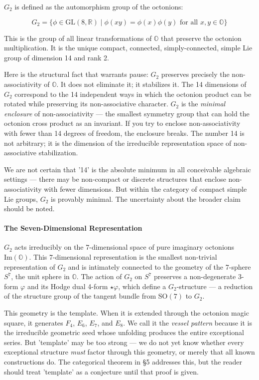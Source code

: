 \documentclass[12pt,a4paper]{article}
\newcommand{\pilcrow}{\S}
\begin{document}
$G_2$ is defined as the automorphism group of the octonions:

\[G_2 = \{ \phi \in \text{GL}(8,\mathbb{R}) \mid \phi(xy) = \phi(x)\phi(y) \text{ for all } x,y \in \mathbb{O} \}\]

This is the group of all linear transformations of $\mathbb{O}$ that preserve the octonion multiplication. It is the unique compact, connected, simply-connected, simple Lie group of dimension 14 and rank 2.

Here is the structural fact that warrants pause: $G_2$ preserves precisely the non-associativity of $\mathbb{O}$. It does not eliminate it; it stabilizes it. The 14 dimensions of $G_2$ correspond to the 14 independent ways in which the octonion product can be rotated while preserving its non-associative character. $G_2$ is the \emph{minimal enclosure} of non-associativity --- the smallest symmetry group that can hold the octonion cross product as an invariant. If you try to enclose non-associativity with fewer than 14 degrees of freedom, the enclosure breaks. The number 14 is not arbitrary; it is the dimension of the irreducible representation space of non-associative stabilization.

We are not certain that '14' is the absolute minimum in all conceivable algebraic settings --- there may be non-compact or discrete structures that enclose non-associativity with fewer dimensions. But within the category of compact simple Lie groups, $G_2$ is provably minimal. The uncertainty about the broader claim should be noted.

\paragraph{The Seven-Dimensional Representation}

$G_2$ acts irreducibly on the 7-dimensional space of pure imaginary octonions $\text{Im}(\mathbb{O})$. This 7-dimensional representation is the smallest non-trivial representation of $G_2$ and is intimately connected to the geometry of the 7-sphere $S^7$, the unit sphere in $\mathbb{O}$. The action of $G_2$ on $S^7$ preserves a non-degenerate 3-form $\varphi$ and its Hodge dual 4-form $\star\varphi$, which define a $G_2$-structure --- a reduction of the structure group of the tangent bundle from $\text{SO}(7)$ to $G_2$.

This geometry is the template. When it is extended through the octonion magic square, it generates $F_4$, $E_6$, $E_7$, and $E_8$. We call it the \emph{vessel pattern} because it is the irreducible geometric seed whose unfolding produces the entire exceptional series. But 'template' may be too strong --- we do not yet know whether every exceptional structure \emph{must} factor through this geometry, or merely that all known constructions do. The categorical theorem in \pilcrow{}5 addresses this, but the reader should treat 'template' as a conjecture until that proof is given.
\end{document}
